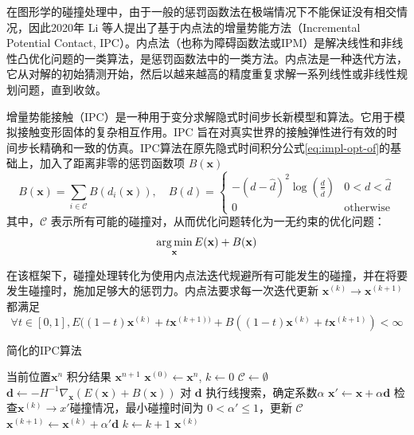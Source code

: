 在图形学的碰撞处理中，由于一般的惩罚函数法在极端情况下不能保证没有相交情况，因此2020年 Li 等人提出了基于内点法的增量势能方法（Incremental Potential Contact, IPC）。内点法（也称为障碍函数法或IPM）是解决线性和非线性凸优化问题的一类算法，是惩罚函数法中的一类方法。内点法是一种迭代方法，它从对解的初始猜测开始，然后以越来越高的精度重复求解一系列线性或非线性规划问题，直到收敛。 %

增量势能接触（IPC）是一种用于变分求解隐式时间步长新模型和算法。它用于模拟接触变形固体的复杂相互作用。IPC 旨在对真实世界的接触弹性进行有效的时间步长精确和一致的仿真。IPC算法在原先隐式时间积分公式\ref{eq:impl-opt-of}的基础上，加入了距离非零的惩罚函数项 $B(\mathbf x)$
\begin{equation}\label{eq:barrier-func}
  B(\mathbf x) = \sum_{i \in \mathcal C} B(d_i(\mathbf x)), \quad B(d)= \begin{cases}
-(d - \hat d) ^ {2} \log \left(\frac{d}{\hat d}\right) & 0 < d < \hat d\\
0 & \mathrm{otherwise}
\end{cases}
\end{equation}
其中，$\mathcal C$ 表示所有可能的碰撞对，从而优化问题转化为一无约束的优化问题：
\begin{equation}\label{eq:ipc-opt-problem}
  \mathop{\arg\min}\limits_{\mathbf{x}} E(\mathbf{x}) + B(\mathbf{x})
\end{equation}

在该框架下，碰撞处理转化为使用内点法迭代规避所有可能发生的碰撞，并在将要发生碰撞时，施加足够大的惩罚力。内点法要求每一次迭代更新 $\mathbf{x}^{(k)} \rightarrow \mathbf{x}^{(k+1)}$ 都满足
\begin{equation}
  \forall t \in [0, 1], E((1-t)\mathbf{x}^{(k)} + t \mathbf{x}^{(k+1))} + B((1-t)\mathbf{x}^{(k)} + t \mathbf{x}^{(k+1)}) < \infty
\end{equation}

\begin{algorithm}
  \caption{简化的IPC算法}\label{alg:ipc-sim}
  \begin{algorithmic}[1]
    \Require 当前位置$\mathbf x^{n}$
    \Ensure 积分结果 $\mathbf x^{n+1}$
    \State $\mathbf x^{(0)} \leftarrow \mathbf x^{n}$, $k \leftarrow 0$
    \State $\mathcal C \leftarrow \emptyset$
      \State $\mathbf d \leftarrow - H^{-1}\nabla_{\mathbf x}(E(\mathbf x) + B(\mathbf x))$
      \State 对 $\mathbf d$ 执行线搜索，确定系数$\alpha$
      \State $\mathbf x'\leftarrow \mathbf x + \alpha \mathbf d$
      \State 检查$\mathbf x^{(k)} \rightarrow x'$碰撞情况，最小碰撞时间为 $ 0 < \alpha' \le 1$，更新 $\mathcal C$
      \State $\mathbf x^{(k+1)} \leftarrow \mathbf x^{(k)} + \alpha' \mathbf d$
      \State $k\leftarrow k + 1$
    \EndWhile
    \State \Return $\mathbf x^{(k)}$
  \end{algorithmic}
\end{algorithm}


